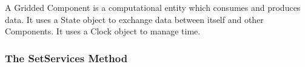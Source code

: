 %


A Gridded Component is a computational entity which
consumes and produces data.  It uses a State object to
exchange data between itself and other Components.  It 
uses a Clock object to manage time.

\subsubsection{The SetServices Method}




